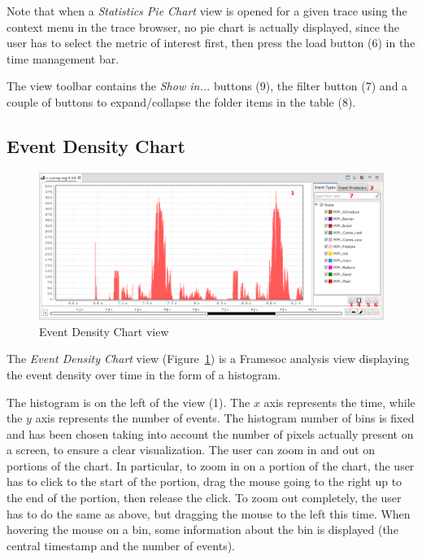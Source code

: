 \documentclass[twoside]{article}
\begin{document}
\begin{sloppypar}
Note that when a \emph{Statistics Pie Chart} view is opened for a given trace using the context menu in the trace browser, no pie chart is actually displayed, since the user has to select the metric of interest first, then press the load button (\num{6}) in the time management bar.

The view toolbar contains the \emph{Show in...} buttons (\num{9}), the filter button (\num{7}) and a couple of buttons to expand/collapse the folder items in the table (\num{8}).

\subsection{Event Density Chart}
\label{subsec:histogram}

\begin{figure}[h!]
  \centering
    \includegraphics[width=1.0\textwidth]{images/histogram.png}
  \caption{Event Density Chart view}
  \label{fig:histogram}
\end{figure}

The \emph{Event Density Chart} view (Figure~\ref{fig:histogram}) is a Framesoc analysis view displaying the event density over time in the form of a histogram.

The histogram is on the left of the view (\num{1}).
The $x$ axis represents the time, while the $y$ axis represents the number of events.
The histogram number of bins is fixed and has been chosen taking into account the number of pixels actually present on a screen, to ensure a clear visualization. 
The user can zoom in and out on portions of the chart. 
In particular, to zoom in on a portion of the chart, the user has to click to the start of the portion, drag the mouse going to the right up to the end of the portion, then release the click.
To zoom out completely, the user has to do the same as above, but dragging the mouse to the left this time.
When hovering the mouse on a bin, some information about the bin is displayed (the central timestamp and the number of events).


\end{sloppypar}
\end{document}
